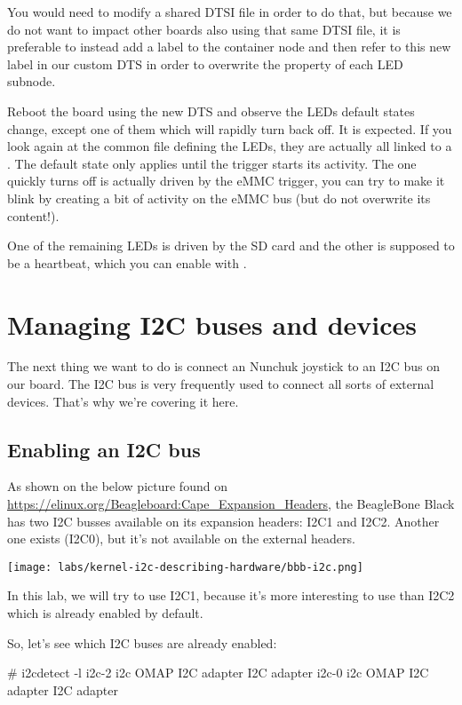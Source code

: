 You would need to modify a shared DTSI file in order to do that, but because we
do not want to impact other boards also using that same DTSI file, it is
preferable to instead add a label to the  container node and then
refer to this new label in our custom DTS in order to overwrite the
 property of each LED subnode.

Reboot the board using the new DTS and observe the LEDs default states
change, except one of them which will rapidly turn back off. It is
expected. If you look again at the common file defining the LEDs, they
are actually all linked to a . The default
state only applies until the trigger starts its activity. The one
quickly turns off is actually driven by the eMMC trigger, you can try to
make it blink by creating a bit of activity on the eMMC bus (but do not
overwrite its content!).

One of the remaining LEDs is driven by the SD card and the other is
supposed to be a heartbeat, which you can enable with
.

\section{Managing I2C buses and devices}

The next thing we want to do is connect an Nunchuk joystick
to an I2C bus on our board. The I2C bus is very frequently used
to connect all sorts of external devices. That's why we're covering
it here.

\subsection{Enabling an I2C bus}

As shown on the below picture found on
\url{https://elinux.org/Beagleboard:Cape_Expansion_Headers}, the
BeagleBone Black has two I2C busses available on its expansion headers:
I2C1 and I2C2. Another one exists (I2C0), but it's not
available on the external headers.

\texttt{[image: labs/kernel-i2c-describing-hardware/bbb-i2c.png]}

In this lab, we will try to use I2C1, because it's more interesting to
use than I2C2 which is already enabled by default.

So, let's see which I2C buses are already enabled:

\begin{bashinput}
# i2cdetect -l
i2c-2	i2c             OMAP I2C adapter                        I2C adapter
i2c-0	i2c             OMAP I2C adapter                        I2C adapter
\end{bashinput}

